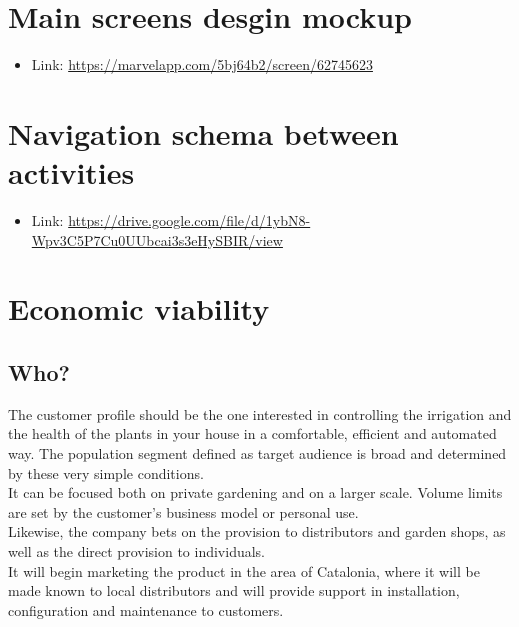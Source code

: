 \documentclass[11pt,a4paper]{article}
\begin{document}
\newpage


\section{Main screens desgin mockup}
\begin{itemize}
\item Link: \url{https://marvelapp.com/5bj64b2/screen/62745623}
\end{itemize}

\section{Navigation schema between activities}
\begin{itemize}
\item Link: \url{https://drive.google.com/file/d/1ybN8-Wpv3C5P7Cu0UUbcai3s3eHySBIR/view}
\end{itemize}

\section{Economic viability}
\subsection{Who?}
The customer profile should be the one interested in controlling the irrigation and the health of the plants in your house in a comfortable, efficient and automated way. The population segment defined as target audience is broad and determined by these very simple conditions. \\

It can be focused both on private gardening and on a larger scale. Volume limits are set by the customer's business model or personal use. \\

Likewise, the company bets on the provision to distributors and garden shops, as well as the direct provision to individuals.\\

It will begin marketing the product in the area of Catalonia, where it will be made known to local distributors and will provide support in installation, configuration and maintenance to customers. 
\end{document}
